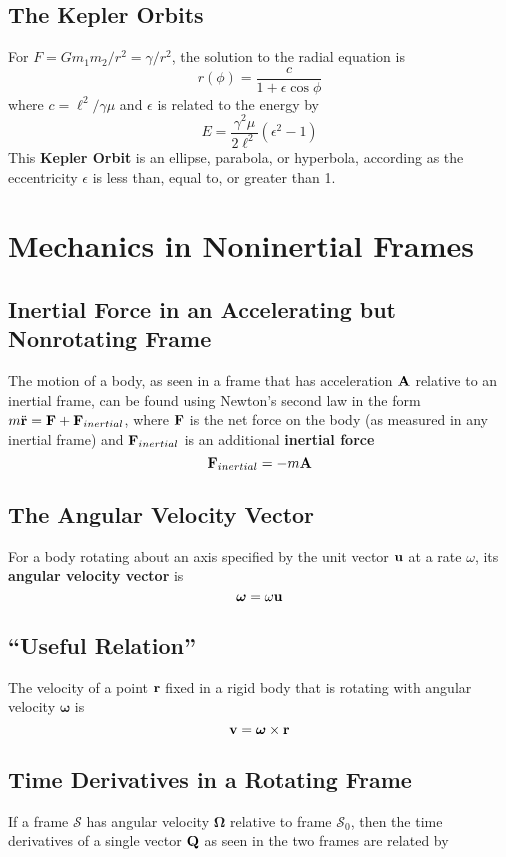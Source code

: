 \documentclass{article}
\begin{document}
\subsection{The Kepler Orbits}
For $F = Gm_1 m_2/r^2 = \gamma/r^2$, the solution to the radial equation is
$$
r(\phi) = \frac{c}{1+\epsilon\cos\phi}
$$
where $c = \ell^2/\gamma\mu$ and $\epsilon$ is related to the energy by 
$$
E = \frac{\gamma^2 \mu}{2 \ell^2}(\epsilon^2 - 1)
$$
This \textbf{Kepler Orbit} is an ellipse, parabola, or hyperbola, according as the eccentricity $\epsilon$ is less than, equal to, or greater than 1.

\section{Mechanics in Noninertial Frames}
\subsection{Inertial Force in an Accelerating but Nonrotating Frame}
The motion of a body, as seen in a frame that has acceleration $\vb{A}$ relative to an inertial frame, can be found using Newton's second law in the form $ m \ddot{\vb{r}} = \vb{F} + \vb{F}_{inertial}$, where $\vb{F}$ is the net force on the body (as measured in any inertial frame) and $\vb{F}_{inertial}$ is an additional \textbf{inertial force}
$$
\vb{F}_{inertial} = -m\vb{A}
$$
\subsection{The Angular Velocity Vector}
For a body rotating about an axis specified by the unit vector $\vb{u}$ at a rate $\omega$, its \textbf{angular velocity vector} is
$$
\bm{\omega} = \omega \vb{u}
$$
\subsection{``Useful Relation''}
The velocity of a point $\vb{r}$ fixed in a rigid body that is rotating with angular velocity $\bm{\omega}$ is 
$$
\vb{v} = \bm{\omega} \times \vb{r}
$$

\subsection{Time Derivatives in a Rotating Frame}
If a frame $\mathcal{S}$ has angular velocity $\bm{\Omega}$ relative to frame $\mathcal{S}_0$, then the time derivatives of a single vector $\vb{Q}$ as seen in the two frames are related by
\end{document}
